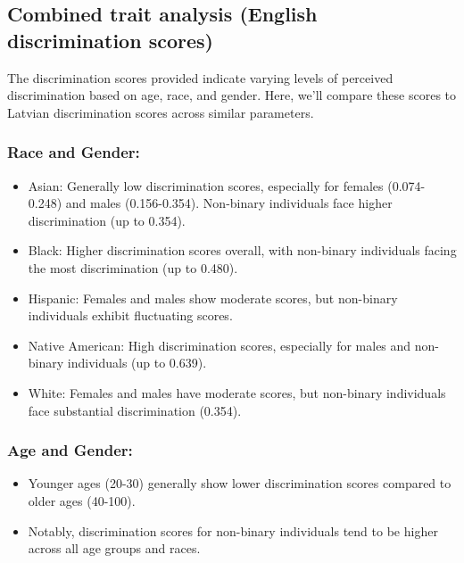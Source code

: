\documentclass[11pt,twocolumn]{article}
\begin{document}
\subsection{Combined trait analysis (English discrimination scores)}
The discrimination scores provided indicate varying levels of perceived discrimination based on age, race, and gender. Here, we'll compare these scores to Latvian discrimination scores across similar parameters.



\subsubsection{Race and Gender:}
\begin{itemize}
    \item Asian: Generally low discrimination scores, especially for females (0.074-0.248) and males (0.156-0.354). Non-binary individuals face higher discrimination (up to 0.354).
\end{itemize}
   \begin{itemize}
       \item Black: Higher discrimination scores overall, with non-binary individuals facing the most discrimination (up to 0.480).
   \end{itemize}
\begin{itemize}
    \item Hispanic: Females and males show moderate scores, but non-binary individuals exhibit fluctuating scores.
\end{itemize}
\begin{itemize}
    \item Native American: High discrimination scores, especially for males and non-binary individuals (up to 0.639).
\end{itemize}
\begin{itemize}
    \item White: Females and males have moderate scores, but non-binary individuals face substantial discrimination (0.354).
\end{itemize}

\subsubsection{Age and Gender:}
\begin{itemize}
    \item Younger ages (20-30) generally show lower discrimination scores compared to older ages (40-100).
\end{itemize}
\begin{itemize}
    \item Notably, discrimination scores for non-binary individuals tend to be higher across all age groups and races.
\end{itemize}
\end{document}
